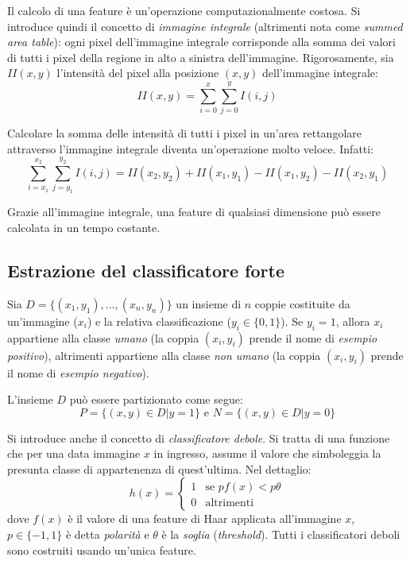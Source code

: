 \documentclass[a4paper,11pt,oneside]{article}
\begin{document}
				Il calcolo di una feature è un'operazione computazionalmente costosa. Si introduce quindi il concetto di \emph{immagine integrale} (altrimenti nota come \emph{summed area table}): ogni pixel dell'immagine integrale corrisponde alla somma dei valori di tutti i pixel della regione in alto a sinistra dell'immagine.
				Rigorosamente, sia $II(x,y)$ l'intensità del pixel alla posizione $(x,y)$ dell'immagine integrale: $$ II(x, y) = \sum_{i = 0}^{x} \sum_{j = 0}^{y} I(i, j) $$

				Calcolare la somma delle intensità di tutti i pixel in un'area rettangolare attraverso l'immagine integrale diventa un'operazione molto veloce.
				Infatti: $$ \sum_{i = x_1}^{x_2} \sum_{j = y_1}^{y_2} I(i,j) =
				II(x_2, y_2) + II(x_1, y_1) - II(x_1, y_2) - II(x_2, y_1)$$

				Grazie all'immagine integrale, una feature di qualsiasi dimensione può essere calcolata in un tempo costante.


		\subsection{Estrazione del classificatore forte} %
		\label{sub:estrazione_del_classificatore_forte}
			Sia $D = \{(x_1, y_1), ..., (x_n, y_n)\}$ un insieme di $n$ coppie costituite da un'immagine ($x_i$) e la relativa classificazione ($y_i \in \{ 0, 1 \}$). Se $y_i = 1$, allora $x_i$ appartiene alla classe \emph{umano} (la coppia $(x_i, y_i)$ prende il nome di \emph{esempio positivo}), altrimenti appartiene alla classe \emph{non umano} (la coppia $(x_i, y_i)$ prende il nome di \emph{esempio negativo}).

			L'insieme $D$ può essere partizionato come segue:
			$$P = \{(x, y) \in D | y = 1\} \text{ e } N = \{(x,y) \in D | y = 0\}$$

			Si introduce anche il concetto di \emph{classificatore debole}. Si tratta di una funzione che per una data immagine $x$ in ingresso, assume il valore che simboleggia la presunta classe di appartenenza di quest'ultima.
			Nel dettaglio:
			\begin{equation}
				h(x) = \begin{cases}
					1 & \text{se $pf(x) < p\theta$}\\
					0 & \text{altrimenti}
				\end{cases}
			\end{equation}
			dove $f(x)$ è il valore di una feature di Haar applicata all'immagine $x$, $p \in \{-1,1\}$ è detta \emph{polarità} e $\theta$ è la \emph{soglia} (\emph{threshold}). Tutti i classificatori deboli sono costruiti usando un'unica feature.
\end{document}
